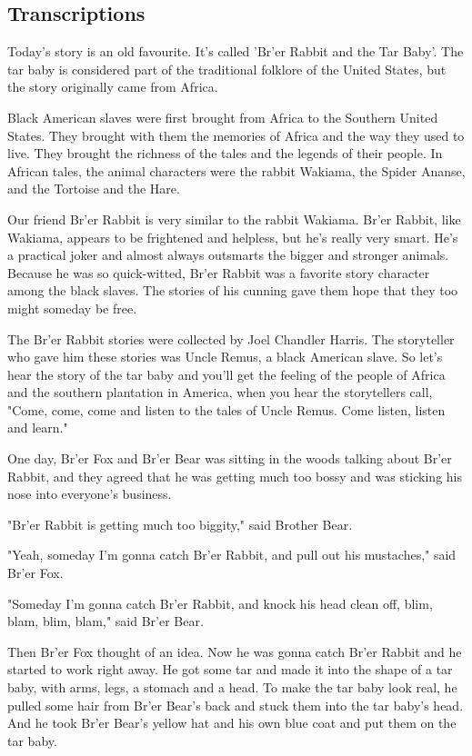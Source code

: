 \subsection{Transcriptions}

Today's story is an old favourite. It's called 'Br'er Rabbit and the Tar Baby'. The tar baby is considered part of the traditional folklore of the United States, but the story originally came from Africa.

Black American slaves were first brought from Africa to the Southern United States. They brought with them the memories of Africa and the way they used to live. They brought the richness of the tales and the legends of their people. In African tales, the animal characters were the rabbit Wakiama, the Spider Ananse, and the Tortoise and the Hare.

Our friend Br'er Rabbit is very similar to the rabbit Wakiama. Br'er Rabbit, like Wakiama, appears to be frightened and helpless, but he's really very smart. He's a practical joker and almost always outsmarts the bigger and stronger animals. Because he was so quick-witted, Br'er Rabbit was a favorite story character among the black slaves. The stories of his cunning gave them hope that they too might someday be free.

The Br'er Rabbit stories were collected by Joel Chandler Harris. The storyteller who gave him these stories was Uncle Remus, a black American slave. So let's hear the story of the tar baby and you'll get the feeling of the people of Africa and the southern plantation in America, when you hear the storytellers call, "Come, come, come and listen to the tales of Uncle Remus. Come listen, listen and learn."

One day, Br'er Fox and Br'er Bear was sitting in the woods talking about Br'er Rabbit, and they agreed that he was getting much too bossy and was sticking his nose into everyone's business.

"Br'er Rabbit is getting much too biggity," said Brother Bear.

"Yeah, someday I'm gonna catch Br'er Rabbit, and pull out his mustaches," said Br'er Fox.

"Someday I'm gonna catch Br'er Rabbit, and knock his head clean off, blim, blam, blim, blam," said Br'er Bear.

Then Br'er Fox thought of an idea. Now he was gonna catch Br'er Rabbit and he started to work right away. He got some tar and made it into the shape of a tar baby, with arms, legs, a stomach and a head. To make the tar baby look real, he pulled some hair from Br'er Bear's back and stuck them into the tar baby's head. And he took Br'er Bear's yellow hat and his own blue coat and put them on the tar baby.

